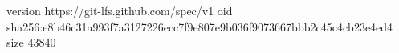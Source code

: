 version https://git-lfs.github.com/spec/v1
oid sha256:e8b46c31a993f7a3127226ecc7f9e807e9b036f9073667bbb2c45c4cb23e4ed4
size 43840
